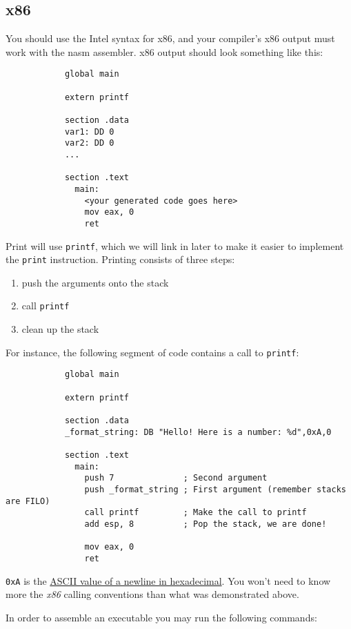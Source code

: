 \documentclass{article}
\newcommand{\code}[1]{\texttt{\textmd{#1}}}
\begin{document}
	\subsection{x86}

		You should use the Intel syntax for x86, and your compiler's x86 output must work with the nasm assembler.
		x86 output should look something like this:

		\begin{lstlisting}
			global main

			extern printf

			section .data
			var1: DD 0
			var2: DD 0
			...

			section .text
			  main:
			    <your generated code goes here>
			    mov eax, 0
			    ret
		\end{lstlisting}

		Print will use \code{printf}, which we will link in later to make it easier to implement the \code{print}
		instruction. Printing consists of three steps:

		\begin{enumerate}
			\item push the arguments onto the stack
			\item call \code{printf}
			\item clean up the stack
		\end{enumerate}

		For instance, the following segment of code contains a call to \code{printf}:

		\begin{lstlisting}
			global main

			extern printf

			section .data
			_format_string: DB "Hello! Here is a number: %d",0xA,0

			section .text
			  main:
			    push 7              ; Second argument
			    push _format_string ; First argument (remember stacks are FILO)
			    call printf         ; Make the call to printf
			    add esp, 8          ; Pop the stack, we are done!

			    mov eax, 0
			    ret
		\end{lstlisting}

		\texttt{0xA} is the \href{http://www.asciitable.com/}{ASCII value of a newline in hexadecimal}. You won't need
		to know more the \textit{x86} calling conventions than what was demonstrated above.

		In order to assemble an executable you may run the following commands:
\end{document}
